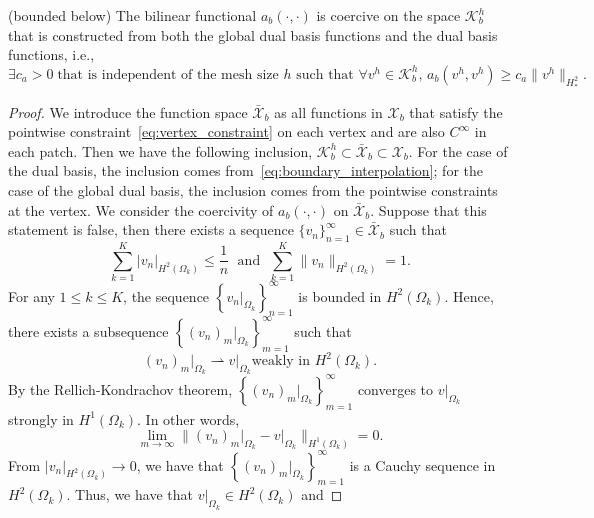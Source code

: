 \begin{lemma}\label{aspt:coercive}
  (bounded below) The bilinear functional $a_b(\cdot,\cdot)$ is coercive on the space $\mathcal{K}^h_b$ that is constructed from both the global dual basis functions and the \Bezier dual basis functions, i.e.,
  \begin{equation}
    \exists{c_a>0}\;\text{that is independent of the mesh size $h$ such that}\,\,\forall{v^h}\in\mathcal{K}_b^h,\, a_b(v^h,v^h)\geq{c_a\|{v^h}\|_{H^2_*}}.\label{eq:coercive}
  \end{equation}
  \begin{proof}
    We introduce the function space $\bar{\mathcal{X}}_b$ as all functions in $\mathcal{X}_b$ that satisfy the pointwise constraint~\eqref{eq:vertex_constraint} on each vertex and are also $C^\infty$ in each patch. Then we have the following inclusion, $\mathcal{K}^h_b\subset \bar{\mathcal{X}}_b \subset  \mathcal{X}_b$. For the case of the \Bezier dual basis, the inclusion comes from~\eqref{eq:boundary_interpolation}; for the case of the global dual basis, the inclusion comes from the pointwise constraints at the vertex. We consider the coercivity of $a_b(\cdot,\cdot)$ on $\bar{\mathcal{X}}_b$. Suppose that this statement is false, then there exists a sequence $\{v_n\}_{n=1}^{\infty}\in \bar{\mathcal{X}}_b$ such that
    \begin{equation}
      \sum_{k=1}^K\vert v_n \vert_{H^2(\Omega_k)}\leq \frac{1}{n}\;\text{ and }\;\sum_{k=1}^K\| v_n \|_{H^2(\Omega_k)}=1.\label{eq:countrary}
    \end{equation}
    For any $1\leq k \leq K$, the sequence $\left\{ v_n\vert_{\Omega_k} \right\}_{n=1}^\infty$ is bounded in $H^2(\Omega_k)$. Hence, there exists a subsequence $\left\{ (v_n)_m\vert_{\Omega_k} \right\}_{m=1}^\infty$ such that
    \begin{equation}
      (v_n)_m\vert_{\Omega_k} \rightharpoonup v\vert_{\Omega_k} \text{weakly in } H^2(\Omega_k).
    \end{equation}
    By the Rellich-Kondrachov theorem, $\left\{ (v_n)_m\vert_{\Omega_k} \right\}_{m=1}^\infty$ converges to $v\vert_{\Omega_k}$ strongly in $H^1(\Omega_k)$. In other words,
    \begin{equation}
      \lim_{m\to\infty}\| (v_n)_m \vert_{\Omega_k} -v \vert_{\Omega_k}\|_{H^1(\Omega_k)}=0.
    \end{equation}
    From $\vert v_n \vert_{H^2(\Omega_k)}\rightarrow 0$, we have that $\left\{ (v_n)_m\vert_{\Omega_k} \right\}_{m=1}^\infty$ is a Cauchy sequence in $H^2(\Omega_k)$. Thus, we have that $v \vert_{\Omega_k}\in H^2(\Omega_k)$ and

\end{proof}
\end{lemma}

